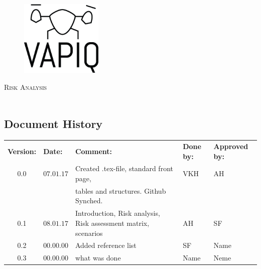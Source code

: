 \documentclass{article}
\author{Tomas Lyngroth \\ Aleksander Holthe \\ Vanja Katinka Halvorsen \\ Stian Fredriksen \\ Kent Kjeldaas \\ Katrine Sundal Haune}
\makeatletter
\let\vapiqteam\@author
\makeatother
\begin{document}
\begin{titlepage}
    \centering
    \pagecolor{gainsboro}
	\\[3.0 cm]
    \begin{figure}[h]
        \centering
        \includegraphics[width = 0.35\textwidth]{VAPIQ-PICTURES//Logo2_Tilted.png}
        \\[2.0 cm] 
    \end{figure}                              
    \textsc{\Huge Risk Analysis}  
    \\[1 cm]
    \textsc{\Large }   
    \\[3.0 cm]
	\large \vapiqteam      
\end{titlepage}
\pagecolor{white}


\begin{center}
\section*{\textbf{Document History}}
\begin{tabular}{cllll}
\rowcolor{cadetgrey}
\textbf{Version:}    &\textbf{Date:} 	 &\textbf{Comment:}    &\textbf{Done by:}   &\textbf{Approved by:}  \\

0.0       & $07.01.17$   & Created .tex-file, standard front page, & VKH  & AH \\
          &              & tables and structures. Github Synched.    &     & \\\rowcolor{gainsboro}
0.1       & $08.01.17$   & Introduction, Risk analysis, Risk assessment matrix, scenarios  & AH    & SF          \\
0.2       & $00.00.00$   & Added reference list  & SF    & Name          \\ \rowcolor{gainsboro}
0.3       & $00.00.00$   & what was done  & Name    & Neme          \\
\end{tabular}                                                                   
\end{center}
\end{document}
